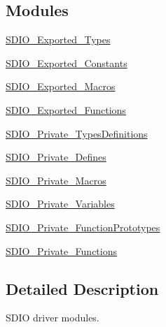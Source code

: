\subsection*{Modules}
\begin{DoxyCompactItemize}
\item 
\hyperlink{group___s_d_i_o___exported___types}{S\+D\+I\+O\+\_\+\+Exported\+\_\+\+Types}
\item 
\hyperlink{group___s_d_i_o___exported___constants}{S\+D\+I\+O\+\_\+\+Exported\+\_\+\+Constants}
\item 
\hyperlink{group___s_d_i_o___exported___macros}{S\+D\+I\+O\+\_\+\+Exported\+\_\+\+Macros}
\item 
\hyperlink{group___s_d_i_o___exported___functions}{S\+D\+I\+O\+\_\+\+Exported\+\_\+\+Functions}
\item 
\hyperlink{group___s_d_i_o___private___types_definitions}{S\+D\+I\+O\+\_\+\+Private\+\_\+\+Types\+Definitions}
\item 
\hyperlink{group___s_d_i_o___private___defines}{S\+D\+I\+O\+\_\+\+Private\+\_\+\+Defines}
\item 
\hyperlink{group___s_d_i_o___private___macros}{S\+D\+I\+O\+\_\+\+Private\+\_\+\+Macros}
\item 
\hyperlink{group___s_d_i_o___private___variables}{S\+D\+I\+O\+\_\+\+Private\+\_\+\+Variables}
\item 
\hyperlink{group___s_d_i_o___private___function_prototypes}{S\+D\+I\+O\+\_\+\+Private\+\_\+\+Function\+Prototypes}
\item 
\hyperlink{group___s_d_i_o___private___functions}{S\+D\+I\+O\+\_\+\+Private\+\_\+\+Functions}
\end{DoxyCompactItemize}


\subsection{Detailed Description}
S\+D\+IO driver modules. 

